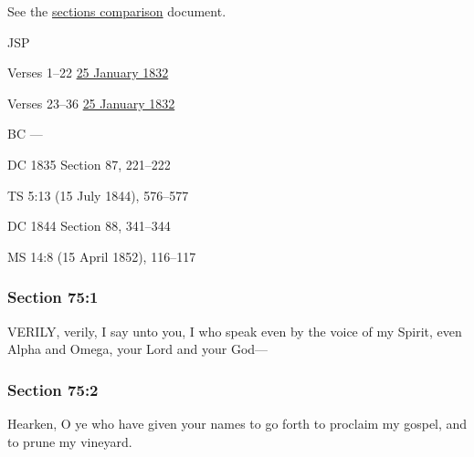 		See the \href{https://drive.google.com/file/d/1goAvNz8jS4R8slYfMG_db55Ty2z_vmgK/view?usp=sharing}{sections comparison} document.
	
		\begin{compactdesc}
			\item[JSP] \phantom{.}
				\begin{compactdesc}
					\item[Verses 1--22] \hyperref[EMS-1832-JS-25-JAN-1832-A]{25 January 1832}
					\item[Verses 23--36] \hyperref[EMS-1832-JS-25-JAN-1832-B]{25 January 1832}
				\end{compactdesc}
			\item[BC] ---
			\item[DC 1835] Section 87, 221--222
			\item[TS] 5:13 (15 July 1844), 576--577
			\item[DC 1844] Section 88, 341--344
			\item[MS] 14:8 (15 April 1852), 116--117
		\end{compactdesc}

	\subsubsection{Section 75:1} %
		\label{DC75-1}

		VERILY, verily, I say unto you, I who speak even by the voice of my Spirit, even Alpha and Omega, your Lord and your God---


	\subsubsection{Section 75:2} %
		\label{DC75-2}

		Hearken, O ye who have given your names to go forth to proclaim my gospel, and to prune my vineyard.


